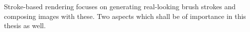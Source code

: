 










Stroke-based rendering focuses on generating real-looking brush strokes and composing images with these.
Two aspects which shall be of importance in this thesis as well.

